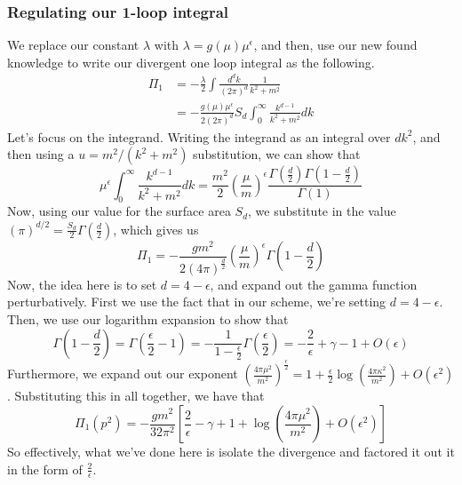 \documentclass[11pt, oneside]{article}   	%
\theoremstyle{slanted}
\begin{document}
\subsubsection{Regulating our 1-loop 
integral}
We replace our 
constant $ \lambda $ with 
$ \lambda  = g \left( \mu  \right)  \mu ^{ \epsilon } $, 
and then, use our new found knowledge to 
write our divergent one loop integral as the following. 
\begin{align*}
\Pi _ 1  &=  
- \frac{\lambda}{2 } \int \frac{ d ^ d k }{ \left( 2 \pi  \right)  ^ d } \frac{1}{
k ^ 2 + m ^ 2 } \\
	 &=  - \frac{g \left( \mu  \right) 
	 \mu ^{ \epsilon } }{ 2 \left( 
 2 \pi \right) ^{ d }} S _ d \int _ 0 ^{ \infty } 
	 \frac{k ^{ d - 1  }  }{ k ^ 2 + m ^ 2 } dk 
\end{align*}
Let's focus on the integrand. 
Writing the integrand as an integral
over $ d k ^ 2 $, and then using 
a $ u =  m ^ 2 / \left( k ^ 2 + m ^ 2  \right)  $ 
substitution, we can show that 
\[
\mu ^{ \epsilon } \int_{ 0 } ^{ \infty } 
\frac{k ^{ d - 1  } }{ k ^ 2 + m ^ 2 } d k  
= \frac{m ^ 2 }{ 2 } \left( \frac{\mu }{ m }  \right) ^{ \epsilon } 
\frac{\Gamma \left( \frac{d}{2 }  \right)  \Gamma \left( 1 - \frac{d}{2 }  \right)  }{
\Gamma \left( 1  \right) }
\] Now, using our value for
the surface area $ S _ d  $, we substitute in the 
value $ \left( \pi  \right) ^{ d / 2 }  = \frac{S _ d }{ 2 } \Gamma 
\left( \frac{d}{2 }  \right)  $, which 
gives us 
\[
\Pi _ 1 = - \frac{g m ^ 2 }{ 2 \left( 4 \pi  \right) ^{ \frac{d}{2 } } } 
\left( \frac{\mu }{  m } \right)^{ \epsilon } \Gamma \left( 
1 - \frac{d}{2 } \right)  
\] Now, the idea here 
is to set $ d  = 4 - \epsilon $, and 
expand out the gamma function 
perturbatively.
First we use the fact that in 
our scheme, we're setting $ d  = 4 - \epsilon $. 
Then, we use our logarithm expansion to 
show that  
\[
\Gamma \left( 1 - \frac{d}{2 }  \right)   = 
\Gamma \left( \frac{\epsilon }{ 2 }  - 1  \right)   = - \frac{1}{
1 - \frac{\epsilon}{ 2 } } \Gamma \left( \frac{\epsilon}{2 }  \right)  
= - \frac{2}{\epsilon } + \gamma  - 1 + O \left( \epsilon  \right)  
\] Furthermore, 
we expand out our exponent $\left( \frac{4 \pi \mu ^ 2 }{ m ^ 2 } \right)^{ 
\frac{\epsilon}{2 } }  = 1 + \frac{\epsilon }{ 2 } \log \left( 
\frac{4 \pi \kappa ^ 2 }{  m ^ 2 }  \right) + O \left( \epsilon ^ 2  \right)  	  $. 
Substituting this in all together, 
we have that 
\[
\Pi _ 1 \left( p ^ 2  \right)   =  -   \frac{gm ^ 2 }{ 32 \pi ^ 2 } 
\left[  \frac{2 }{ \epsilon } - \gamma + 1 + \log \left( \frac{
4 \pi \mu ^ 2 }{ m ^ 2 }  \right)  + O \left( \epsilon ^ 2  \right)  \right] 
\] So effectively, what we've done here is 
isolate the divergence and factored it out 
it in the form of $ \frac{2}{\epsilon } $. 
\end{document}

